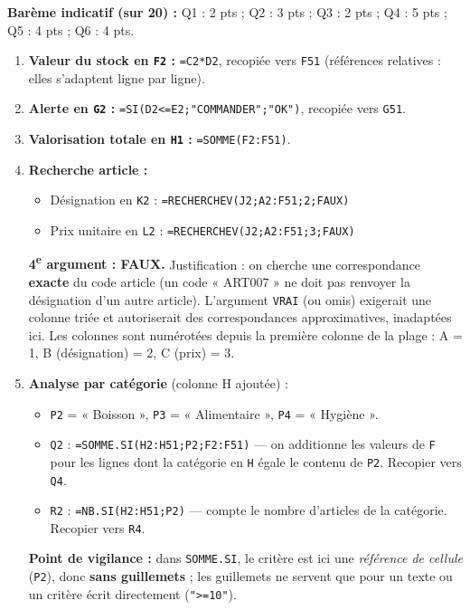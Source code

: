 \documentclass[11pt]{article}
\begin{document}
\begin{corrige}
\textbf{Barème indicatif (sur 20) :} Q1 : 2 pts ; Q2 : 3 pts ; Q3 : 2 pts ; Q4 : 5 pts ; Q5 : 4 pts ; Q6 : 4 pts.

\begin{enumerate}
    \item \textbf{Valeur du stock en \texttt{F2} :} \texttt{=C2*D2}, recopiée vers \texttt{F51} (références relatives : elles s'adaptent ligne par ligne).
    \item \textbf{Alerte en \texttt{G2} :} \texttt{=SI(D2<=E2;"COMMANDER";"OK")}, recopiée vers \texttt{G51}.
    \item \textbf{Valorisation totale en \texttt{H1} :} \texttt{=SOMME(F2:F51)}.
    \item \textbf{Recherche article :}
    \begin{itemize}
        \item Désignation en \texttt{K2} : \texttt{=RECHERCHEV(J2;A2:F51;2;FAUX)}
        \item Prix unitaire en \texttt{L2} : \texttt{=RECHERCHEV(J2;A2:F51;3;FAUX)}
    \end{itemize}
    \textbf{4\textsuperscript{e} argument : FAUX.} Justification : on cherche une correspondance \textbf{exacte} du code article (un code « ART007 » ne doit pas renvoyer la désignation d'un autre article). L'argument \texttt{VRAI} (ou omis) exigerait une colonne triée et autoriserait des correspondances approximatives, inadaptées ici. Les colonnes sont numérotées depuis la première colonne de la plage : A = 1, B (désignation) = 2, C (prix) = 3.
    \item \textbf{Analyse par catégorie} (colonne H ajoutée) :
    \begin{itemize}
        \item \texttt{P2} = « Boisson », \texttt{P3} = « Alimentaire », \texttt{P4} = « Hygiène ».
        \item \texttt{Q2} : \texttt{=SOMME.SI(H2:H51;P2;F2:F51)} — on additionne les valeurs de \texttt{F} pour les lignes dont la catégorie en \texttt{H} égale le contenu de \texttt{P2}. Recopier vers \texttt{Q4}.
        \item \texttt{R2} : \texttt{=NB.SI(H2:H51;P2)} — compte le nombre d'articles de la catégorie. Recopier vers \texttt{R4}.
    \end{itemize}
    \textbf{Point de vigilance :} dans \texttt{SOMME.SI}, le critère est ici une \emph{référence de cellule} (\texttt{P2}), donc \textbf{sans guillemets} ; les guillemets ne servent que pour un texte ou un critère écrit directement (\texttt{">=10"}).

\end{enumerate}
\end{corrige}
\end{document}
